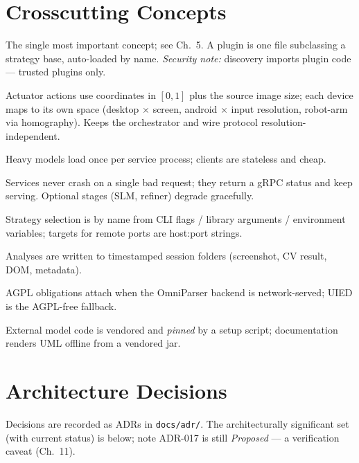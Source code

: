 \documentclass[11pt,a4paper]{report}
\newcommand{\code}[1]{\texttt{#1}}
\begin{document}
\chapter{Crosscutting Concepts}
\begin{description}[leftmargin=0pt,style=nextline]
  \item[Extensibility (strategy + registry + auto-discovery)] The single most
    important concept; see Ch.~5. A plugin is one file subclassing a strategy base,
    auto-loaded by name. \emph{Security note:} discovery imports plugin code ---
    trusted plugins only.
  \item[Normalised coordinate contract] Actuator actions use coordinates in $[0,1]$
    plus the source image size; each device maps to its own space (desktop $\times$
    screen, android $\times$ input resolution, robot-arm via homography). Keeps the
    orchestrator and wire protocol resolution-independent.
  \item[Warm-model services] Heavy models load once per service process; clients are
    stateless and cheap.
  \item[Error handling] Services never crash on a single bad request; they return a
    gRPC status and keep serving. Optional stages (SLM, refiner) degrade gracefully.
  \item[Configuration] Strategy selection is by name from CLI flags / library
    arguments / environment variables; targets for remote ports are host:port
    strings.
  \item[Persistence] Analyses are written to timestamped session folders
    (screenshot, CV result, DOM, metadata).
  \item[Licensing] AGPL obligations attach when the OmniParser backend is
    network-served; UIED is the AGPL-free fallback.
  \item[Offline operation] External model code is vendored and \emph{pinned} by a
    setup script; documentation renders UML offline from a vendored jar.
\end{description}

\chapter{Architecture Decisions}
Decisions are recorded as ADRs in \code{docs/adr/}. The architecturally significant
set (with current status) is below; note ADR-017 is still \emph{Proposed} --- a
verification caveat (Ch.~11).
\end{document}
